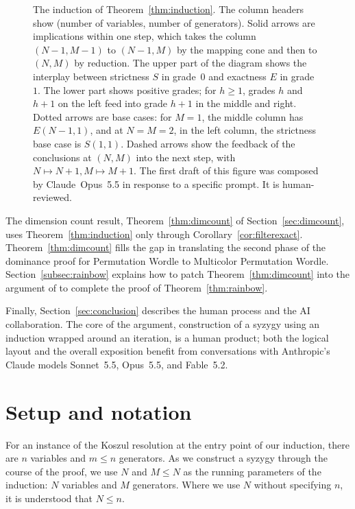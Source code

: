 \documentclass[12pt]{amsart}
\theoremstyle{definition}
\theoremstyle{remark}
\newcommand\classic{Permutation Wordle\xspace}
\newcommand\rainbow{Multicolor Permutation Wordle\xspace}
\newcommand\KSV{monthly-kutin-smithline-vatter}
\begin{document}
\begin{figure}[tbp]
\begin{tikzpicture}
\end{tikzpicture}
\caption{The induction of Theorem~\ref{thm:induction}.  
The column headers show (number of variables, number of generators).
Solid arrows are implications within one step, which takes the column $(N-1,M-1)$ to
$(N-1,M)$ by the mapping cone and then to $(N,M)$ by reduction.  
The upper part of the diagram shows the interplay between strictness $S$ in grade~$0$ and
exactness $E$ in grade~$1$.  The lower part shows positive grades; for $h \geq 1$, grades
$h$ and $h+1$ on the left feed into grade $h+1$ in the middle and right.
Dotted arrows are base cases: for
$M=1$, the middle column has $E(N-1, 1)$, 
and at $N=M=2$, in the left column, the strictness base case is $S(1,1)$.  
Dashed arrows show the feedback of the conclusions at $(N,M)$
into the next step, with $N \mapsto N+1, M \mapsto M+1$.
The first draft of this figure was composed by Claude~Opus~5.5 in response to a specific prompt.
It is human-reviewed.
}
\label{fig:inductionmap}
\end{figure}


The dimension count result, Theorem~\ref{thm:dimcount} of Section~\ref{sec:dimcount},
uses Theorem~\ref{thm:induction} only through Corollary~\ref{cor:filterexact}.
 Theorem~\ref{thm:dimcount} fills the gap in translating the 
    second phase  of the dominance proof for \classic to \rainbow.
    Section~\ref{subsec:rainbow} explains how to patch Theorem~\ref{thm:dimcount}
    into the argument of \cite{\KSV} to complete the proof of Theorem~\ref{thm:rainbow}.

    
    Finally, Section~\ref{sec:conclusion} describes the human process and the
    AI collaboration.  The core of the argument, construction
    of a syzygy using an induction wrapped around an iteration, is a human product; 
    both the logical layout and the overall exposition benefit from
    conversations with Anthropic's Claude models Sonnet~5.5, Opus~5.5, and Fable~5.2.

\section{Setup and notation}\label{sec:setup}

For an instance of the Koszul resolution at the entry point of our induction, 
there are $n$ variables and $m \leq n$ generators.
As we construct a syzygy through the course of the proof, we use $N$ and $M \leq N$
as the running parameters of the induction: $N$ variables and $M$ generators.
Where we use $N$ without specifying $n$, it is understood that $N \leq n$.
\end{document}

